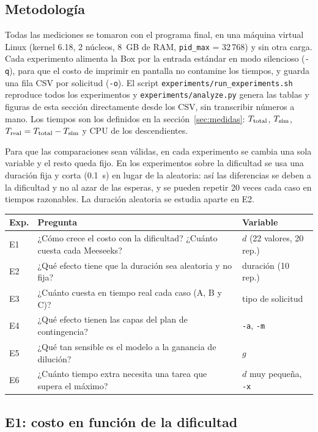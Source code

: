 \subsection{Metodología}

Todas las mediciones se tomaron con el programa final, en una máquina virtual Linux
(kernel 6.18, 2 núcleos, 8~GB de RAM, \texttt{pid\_max} = 32\,768) y sin otra carga. Cada
experimento alimenta la Box por la entrada estándar en modo silencioso (\texttt{-q}), para
que el costo de imprimir en pantalla no contamine los tiempos, y guarda una fila CSV por
solicitud (\texttt{-o}). El script \texttt{experiments/run\_experiments.sh} reproduce
todos los experimentos y \texttt{experiments/analyze.py} genera las tablas y figuras de
esta sección directamente desde los CSV, sin transcribir números a mano. Los tiempos son
los definidos en la sección~\ref{sec:medidas}: $T_{\text{total}}$, $T_{\text{sim}}$, $T_{\text{real}}=T_{\text{total}}-T_{\text{sim}}$ y CPU de los
descendientes.

Para que las comparaciones sean válidas, en cada experimento se cambia una sola variable y
el resto queda fijo. En los experimentos sobre la dificultad se usa una duración fija y
corta (0.1~s) en lugar de la aleatoria: así las diferencias se deben a la dificultad y no
al azar de las esperas, y se pueden repetir 20 veces cada caso en tiempos razonables. La
duración aleatoria se estudia aparte en E2.

\begin{center}
\begin{tabularx}{\linewidth}{lXl}
\toprule
Exp. & Pregunta & Variable \\
\midrule
E1 & ¿Cómo crece el costo con la dificultad? ¿Cuánto cuesta cada Meeseeks? & $d$ (22 valores, 20 rep.) \\
E2 & ¿Qué efecto tiene que la duración sea aleatoria y no fija? & duración (10 rep.) \\
E3 & ¿Cuánto cuesta en tiempo real cada caso (A, B y C)? & tipo de solicitud \\
E4 & ¿Qué efecto tienen las capas del plan de contingencia? & \texttt{-a}, \texttt{-m} \\
E5 & ¿Qué tan sensible es el modelo a la ganancia de dilución? & $g$ \\
E6 & ¿Cuánto tiempo extra necesita una tarea que supera el máximo? & $d$ muy pequeña, \texttt{-x} \\
\bottomrule
\end{tabularx}
\end{center}

\subsection{E1: costo en función de la dificultad}

